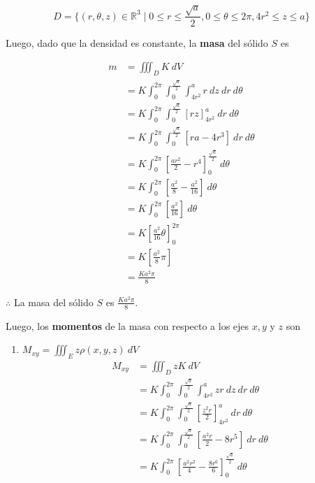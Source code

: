 \documentclass[12pt]{exam}
\begin{document}
\begin{questions}
  \[
  D = \{ (r, \theta, z) \in \mathbb{R}^3 \mid 0 \leq r \leq \frac{\sqrt{a}}{2}, 0 \leq \theta \leq 2\pi, 4r^2 \leq z \leq a \}
  \]

  Luego, dado que la densidad es constante, la \textbf{masa} del sólido $S$ es

  \begin{align*}
    m 
    &= \iiint_D K ~ dV \\
    &= K \int_0^{2\pi} \int_0^{\frac{\sqrt{a}}{2}} \int_{4r^2}^a r ~ dz ~ dr ~ d\theta \\
    &= K \int_0^{2\pi} \int_0^{\frac{\sqrt{a}}{2}} \left[ rz \right]_{4r^2}^a ~ dr ~ d\theta \\
    &= K \int_0^{2\pi} \int_0^{\frac{\sqrt{a}}{2}} \left[ ra - 4r^3 \right] ~ dr ~ d\theta \\
    &= K \int_0^{2\pi} \left[ \frac{ar^2}{2} - r^4 \right]_0^{\frac{\sqrt{a}}{2}} ~ d\theta \\
    &= K \int_0^{2\pi} \left[ \frac{a^2}{8} - \frac{a^2}{16} \right] ~ d\theta \\
    &= K \int_0^{2\pi} \left[ \frac{a^2}{16} \right] ~ d\theta \\
    &= K \left[ \frac{a^2}{16} \theta \right]_0^{2\pi} \\
    &= K \left[ \frac{a^2}{8} \pi \right] \\
    &= \frac{K a^2 \pi}{8}
  \end{align*}

  $\therefore$ La masa del sólido $S$ es $\frac{K a^2 \pi}{8}$.

  Luego, los \textbf{momentos} de la masa con respecto a los ejes $x, y$ y $z$ son

  \begin{enumerate}
  \item $M_{xy} = \iiint_E z \rho (x,y,z) ~ dV$
    \begin{align*}
      M_{xy}
      &= \iiint_D z K ~ dV \\
      &= K \int_0^{2\pi} \int_0^{\frac{\sqrt{a}}{2}} \int_{4r^2}^a zr ~ dz ~ dr ~ d\theta \\
      &= K \int_0^{2\pi} \int_0^{\frac{\sqrt{a}}{2}} \left[ \frac{z^2r}{2} \right]_{4r^2}^a ~ dr ~ d\theta \\
      &= K \int_0^{2\pi} \int_0^{\frac{\sqrt{a}}{2}} \left[ \frac{a^2r}{2} - 8r^5 \right] ~ dr ~ d\theta \\
      &= K \int_0^{2\pi} \left[ \frac{a^2r^2}{4} - \frac{8r^6}{6} \right]_0^{\frac{\sqrt{a}}{2}} ~ d\theta 
    \end{align*}


\end{enumerate}
\end{questions}
\end{document}
